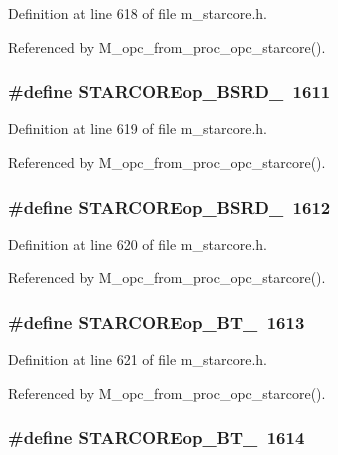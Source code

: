 Definition at line 618 of file m\_\-starcore.h.

Referenced by M\_\-opc\_\-from\_\-proc\_\-opc\_\-starcore().
\subsubsection{\setlength{\rightskip}{0pt plus 5cm}\#define STARCOREop\_\-BSRD\_~1611}\label{m__starcore_8h_fdd338312ef612d811864417f5d96eaf}




Definition at line 619 of file m\_\-starcore.h.

Referenced by M\_\-opc\_\-from\_\-proc\_\-opc\_\-starcore().
\subsubsection{\setlength{\rightskip}{0pt plus 5cm}\#define STARCOREop\_\-BSRD\_~1612}\label{m__starcore_8h_3defedff8b0d8ff56d8ef23df7e451ea}




Definition at line 620 of file m\_\-starcore.h.

Referenced by M\_\-opc\_\-from\_\-proc\_\-opc\_\-starcore().
\subsubsection{\setlength{\rightskip}{0pt plus 5cm}\#define STARCOREop\_\-BT\_~1613}\label{m__starcore_8h_0c7a225c2db5b66e3fd00c93ce0ddde5}




Definition at line 621 of file m\_\-starcore.h.

Referenced by M\_\-opc\_\-from\_\-proc\_\-opc\_\-starcore().
\subsubsection{\setlength{\rightskip}{0pt plus 5cm}\#define STARCOREop\_\-BT\_~1614}\label{m__starcore_8h_5101e4e2fbd82194abb7a870a267fa46}





